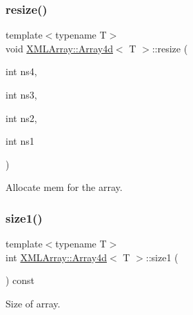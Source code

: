 \subsubsection{\texorpdfstring{resize()}{resize()}\hspace{0.1cm}{\footnotesize\ttfamily [3/3]}}
{\footnotesize\ttfamily template$<$typename T$>$ \\
void \mbox{\hyperlink{classXMLArray_1_1Array4d}{X\+M\+L\+Array\+::\+Array4d}}$<$ T $>$\+::resize (\begin{DoxyParamCaption}\item[{int}]{ns4,  }\item[{int}]{ns3,  }\item[{int}]{ns2,  }\item[{int}]{ns1 }\end{DoxyParamCaption})\hspace{0.3cm}{\ttfamily [inline]}}



Allocate mem for the array. 

\mbox{\label{classXMLArray_1_1Array4d_a27899b6dccfd5d85d299da80da9a4c14}} 
\subsubsection{\texorpdfstring{size1()}{size1()}\hspace{0.1cm}{\footnotesize\ttfamily [1/3]}}
{\footnotesize\ttfamily template$<$typename T$>$ \\
int \mbox{\hyperlink{classXMLArray_1_1Array4d}{X\+M\+L\+Array\+::\+Array4d}}$<$ T $>$\+::size1 (\begin{DoxyParamCaption}{ }\end{DoxyParamCaption}) const\hspace{0.3cm}{\ttfamily [inline]}}



Size of array. 

